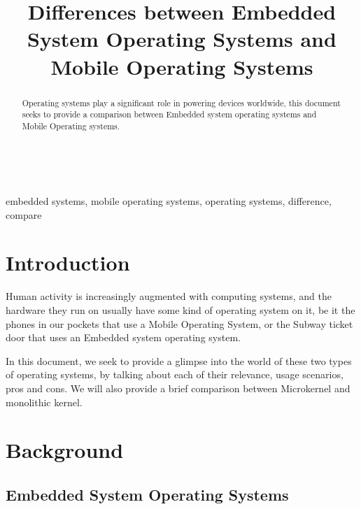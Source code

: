\documentclass[conference]{IEEEtran}
\newcommand{\forceindent}{\leavevmode{\parindent=1em\indent}}
\begin{document}
\title{Differences between Embedded System Operating Systems and Mobile Operating Systems\\
}



\maketitle

\begin{abstract}
Operating systems play a significant role in powering devices worldwide, this document seeks to provide a comparison between Embedded system operating systems and Mobile Operating systems.
\end{abstract}
\mbox{} \\
\forceindent \begin{IEEEkeywords}
embedded systems, mobile operating systems, operating systems, difference, compare
\end{IEEEkeywords}

\section{Introduction}
\forceindent Human activity is increasingly augmented with computing systems, and the hardware they run on usually have some kind of operating system on it, be it the phones in our pockets that use a Mobile Operating System, or the Subway ticket door that uses an Embedded system operating system.

\forceindent In this document, we seek to provide a glimpse into the world of these two types of operating systems, by talking about each of their relevance, usage scenarios, pros and cons. We will also provide a brief comparison between Microkernel and monolithic kernel.

\section{Background}
\subsection{Embedded System Operating Systems}
\end{document}
